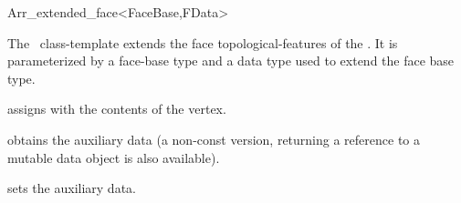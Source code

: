 
\ccRefPageBegin

\begin{ccRefClass}{Arr_extended_face<FaceBase,FData>}

\ccDefinition
  The \ccRefName\ class-template extends the face topological-features of the
  \dcel. It is parameterized by a face-base type  and a data type
   used to extend the face base type.


\ccIsModel

\ccInheritsFrom

\ccCreation
{}
  {assigns \ccVar{} with the contents of the  vertex.}

\ccAccessFunctions

\def\ccLongFuncLayout{\ccTrue}
  {obtains the auxiliary data (a non-const version, returning a reference
   to a mutable data object is also available).}
\def\ccLongParamLayout{\ccFalse}

\ccModifiers
  {sets the auxiliary data.}

\ccSeeAlso

\end{ccRefClass}

\ccRefPageEnd
